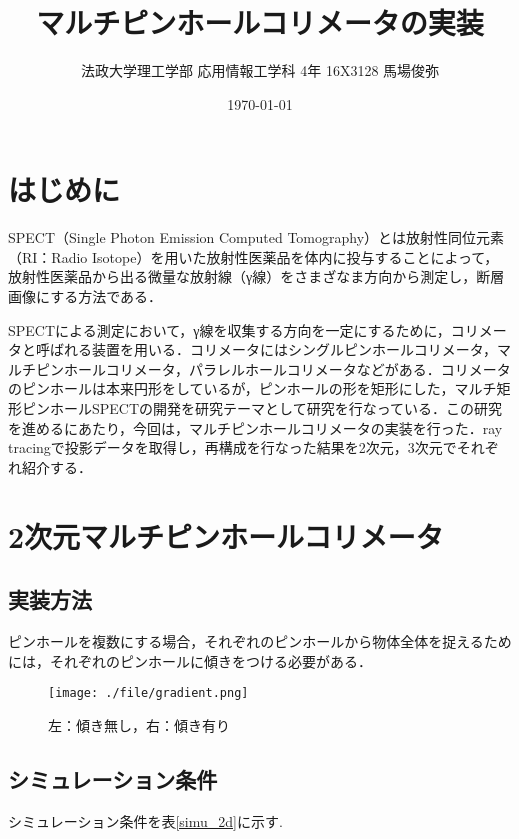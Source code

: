 \documentclass[dvipdfmx,autodetect-engine,twocolumn,10pt]{jsarticle}%
\title{マルチピンホールコリメータの実装}
\author{法政大学理工学部 応用情報工学科 4年 16X3128 馬場俊弥}
\date{\today}
\begin{document}
\maketitle
\section{はじめに}
SPECT（Single Photon Emission Computed Tomography）とは放射性同位元素（RI：Radio Isotope）を用いた放射性医薬品を体内に投与することによって，放射性医薬品から出る微量な放射線（γ線）をさまざなま方向から測定し，断層画像にする方法である．

SPECTによる測定において，γ線を収集する方向を一定にするために，コリメータと呼ばれる装置を用いる．コリメータにはシングルピンホールコリメータ，マルチピンホールコリメータ，パラレルホールコリメータなどがある．コリメータのピンホールは本来円形をしているが，ピンホールの形を矩形にした，マルチ矩形ピンホールSPECTの開発を研究テーマとして研究を行なっている．この研究を進めるにあたり，今回は，マルチピンホールコリメータの実装を行った．ray tracingで投影データを取得し，再構成を行なった結果を2次元，3次元でそれぞれ紹介する．

\newpage

\section{2次元マルチピンホールコリメータ}

\subsection{実装方法}
ピンホールを複数にする場合，それぞれのピンホールから物体全体を捉えるためには，それぞれのピンホールに傾きをつける必要がある．
\begin{figure}[htbp]
  \begin{center}
    \texttt{[image: ./file/gradient.png]}\\
    \caption{左：傾き無し，右：傾き有り}
    \label{gradient}
  \end{center}
\end{figure}

\subsection{シミュレーション条件}
シミュレーション条件を表\ref{simu_2d}に示す.
\end{document}
